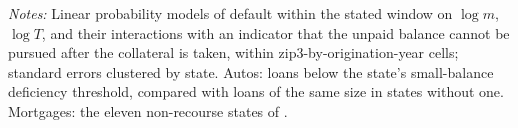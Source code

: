 \begin{table}[ht]
\centering
\caption{The early term effect where the balance cannot be pursued}
\label{tab:term_deficiency}
\resizebox{\textwidth}{!}{}
\vspace{0.5em}
\begin{minipage}{0.95\textwidth}
\small \textit{Notes:} Linear probability models of default within the stated window on $\log m$, $\log T$, and their interactions with an indicator that the unpaid balance cannot be pursued after the collateral is taken, within zip3-by-origination-year cells; standard errors clustered by state. Autos: loans below the state's small-balance deficiency threshold, compared with loans of the same size in states without one. Mortgages: the eleven non-recourse states of \citet{ghent_recourse_2011}.
\end{minipage}
\end{table}
